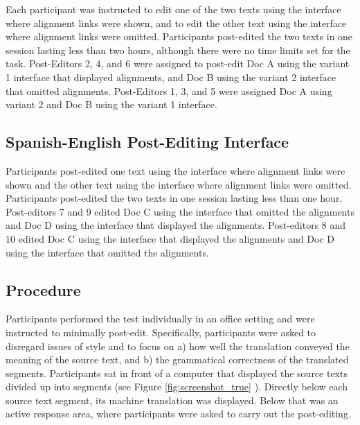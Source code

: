 Each participant was instructed to edit one of the two texts using the interface where alignment links were shown,
%
and to edit the other text using the interface where alignment links were omitted.
%
Participants post-edited the two texts in one session lasting less than two hours, although there were no time limits set for the task.
%
Post-Editors 2, 4, and 6 were assigned to post-edit Doc A using the variant 1 interface that displayed alignments, and Doc B using the variant 2 interface that omitted alignments.
%
Post-Editors 1, 3, and 5 were assigned Doc A using variant 2 and Doc B using the variant 1 interface.


\subsection{Spanish-English Post-Editing Interface}

Participants post-edited one text using the interface where alignment links were shown and the other text using the interface where alignment links were omitted. 
%
Participants post-edited the two texts in one session lasting less than one hour. 
%
Post-editors 7 and 9 edited Doc C using the interface that omitted the alignments and Doc D using the interface that displayed the alignments. 
%
Post-editors 8 and 10 edited Doc C using the interface that displayed the alignments and Doc D using the interface that omitted the alignments.



\subsection{Procedure}

Participants performed the test individually in an office setting and were instructed to minimally post-edit. 
%
Specifically, participants were asked to disregard issues of style and to focus on 
%
a) how well the translation conveyed the meaning of the source text, and 
%
b) the grammatical correctness of the translated segments. 
%
Participants sat in front of a computer that displayed the source texts divided up into segments (see Figure \ref{fig:screenshot_true} ). %
%
Directly below each source text segment, its machine translation was displayed.
%
Below that was an active response area, where participants were asked to carry out the post-editing.

